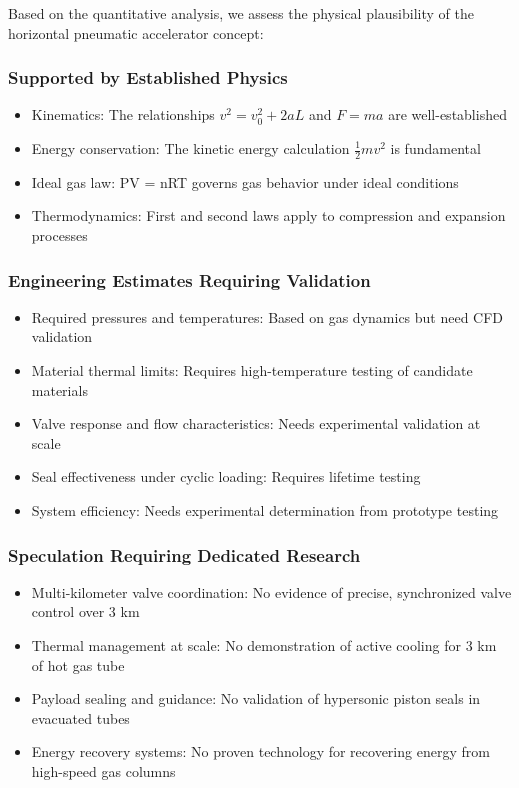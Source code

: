 \documentclass{article}
\begin{document}
Based on the quantitative analysis, we assess the physical plausibility of the horizontal pneumatic accelerator concept:\n\n\subsubsection{Supported by Established Physics}
\begin{itemize}
    \item Kinematics: The relationships $v^2 = v_0^2 + 2aL$ and $F = ma$ are well-established\n    \item Energy conservation: The kinetic energy calculation $\frac{1}{2}mv^2$ is fundamental\n    \item Ideal gas law: PV = nRT governs gas behavior under ideal conditions\n    \item Thermodynamics: First and second laws apply to compression and expansion processes\n\end{itemize}
\n\subsubsection{Engineering Estimates Requiring Validation}
\begin{itemize}
    \item Required pressures and temperatures: Based on gas dynamics but need CFD validation\n    \item Material thermal limits: Requires high-temperature testing of candidate materials\n    \item Valve response and flow characteristics: Needs experimental validation at scale\n    \item Seal effectiveness under cyclic loading: Requires lifetime testing\n    \item System efficiency: Needs experimental determination from prototype testing\n\end{itemize}
\n\subsubsection{Speculation Requiring Dedicated Research}
\begin{itemize}
    \item Multi-kilometer valve coordination: No evidence of precise, synchronized valve control over 3 km\n    \item Thermal management at scale: No demonstration of active cooling for 3 km of hot gas tube\n    \item Payload sealing and guidance: No validation of hypersonic piston seals in evacuated tubes\n    \item Energy recovery systems: No proven technology for recovering energy from high-speed gas columns\n\end{itemize}
\end{document}

